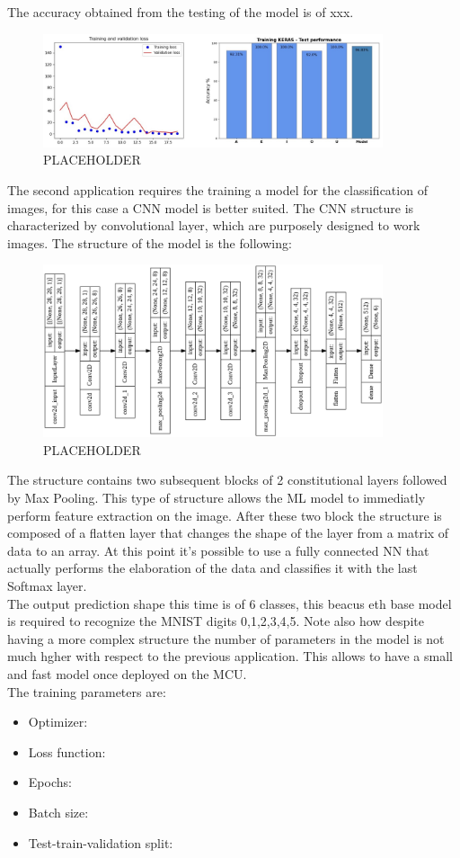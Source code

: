 \documentclass[12pt]{report}
\begin{document}
The accuracy obtained from the testing of the model is of xxx. 
%
\begin{figure}[h!]
    \centering
    \includegraphics[width=100mm]{Figures/Chapter4/training_letters.jpg} 
    \caption{PLACEHOLDER}
    \label{fig:training_letters}    
\end{figure}
%
The second application requires the training a model for the classification of images, for this case a CNN model is better suited. The CNN structure is characterized by convolutional layer, which are purposely designed to work images. The structure of the model is the following: 
%
\begin{figure}[h!]
    \centering
    \includegraphics[width=100mm]{Figures/Chapter4/structure.png} 
    \caption{PLACEHOLDER}
    \label{fig:structure}    
\end{figure}
%
The structure contains two subsequent blocks of 2 constitutional layers followed by Max Pooling. This type of structure allows the ML model to immediatly perform feature extraction on the image. After these two block the structure is composed of a flatten layer that changes the shape of the layer from a matrix of data to an array. At this point it's possible to use a fully connected NN that actually performs the elaboration of the data and classifies it with the last Softmax layer. \\
The output prediction shape this time is of 6 classes, this beacus eth base model is required to recognize the MNIST digits 0,1,2,3,4,5. Note also how despite having a more complex structure the number of parameters in the model is not much hgher with respect to the previous application. This allows to have a small and fast model once deployed on the MCU. \\
The training parameters are:
\begin{itemize}
	\item Optimizer:
	\item Loss function:
	\item Epochs:
	\item Batch size: 
	\item Test-train-validation split: 
\end{itemize}
\end{document}
